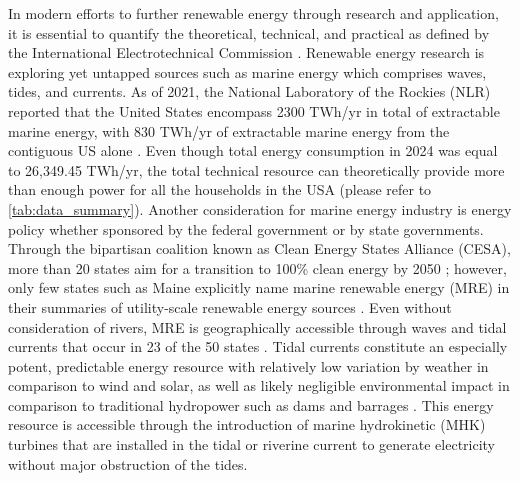 \documentclass[12pt,sort&compress]{elsarticle}
\theoremstyle{definition}%
\begin{document}
\noindent In modern efforts to further renewable energy through research and application, it is essential to quantify the theoretical, technical, and practical as defined by the International Electrotechnical Commission \cite{iea_2020}. Renewable energy research is exploring yet untapped sources such as marine energy which comprises waves, tides, and currents. As of 2021, the National Laboratory of the Rockies (NLR) reported that the United States encompass 2300 TWh/yr in total of extractable marine energy, with 830 TWh/yr of extractable marine energy from the contiguous US alone \cite{nrel_2021}. Even though total energy consumption in 2024 was equal to 26,349.45 TWh/yr, the total technical resource can theoretically provide more than enough power for all the households in the USA (please refer to \autoref{tab:data_summary}). Another consideration for marine energy industry is energy policy whether sponsored by the federal government or by state governments. Through the bipartisan coalition known as Clean Energy States Alliance (CESA),  more than 20 states aim for a transition to 100\% clean energy by 2050 \cite{cesa}; however, only few states such as Maine explicitly name marine renewable energy (MRE) in their summaries of utility-scale renewable energy sources \cite{cesa}. Even without consideration of rivers, MRE is geographically accessible through waves and tidal currents that occur in 23 of the 50 states \cite{nrel_2021}. Tidal currents constitute an especially potent, predictable energy resource with relatively low variation by weather in comparison to wind and solar, as well as likely negligible environmental impact in comparison to traditional hydropower such as dams and barrages \cite{Legrand-2009-1509, [osalusi_2009], [ouro_2019], nrel_2021, [lieber_2024],  [keenan_2024]}. This energy resource is accessible through the introduction of marine hydrokinetic (MHK) turbines that are installed in the tidal or riverine current to generate electricity without major obstruction of the tides. 
\end{document}
